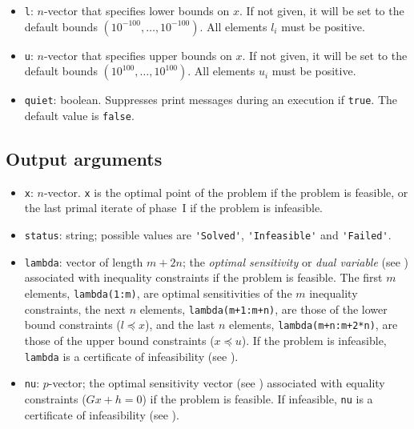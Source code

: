 \documentclass[12pt]{article}
\begin{document}
\begin{itemize}
\item{\tt l}: $n$-vector that specifies lower bounds on $x$.
If not given, it will be set to the default bounds
$(10^{-100}, \ldots, 10^{-100})$. All elements $l_i$ must be positive.

\item{\tt u}: $n$-vector that specifies upper bounds on $x$.
If not given, it will be set to the default bounds
$(10^{100}, \ldots, 10^{100})$. All elements  $u_i$ must be positive.

\item{\tt quiet}: boolean. Suppresses print messages during an execution
if \verb+true+. The default value is \verb+false+.

\end{itemize}


\subsection{Output arguments}

\begin{itemize}
\item{\tt x}: $n$-vector. \verb+x+ is the optimal point of the problem
if the problem is feasible, or the last primal iterate
of phase~I if the problem is infeasible.

\item{\tt status}: string; possible values are
\verb+'Solved'+, \verb+'Infeasible'+ and \verb+'Failed'+.

\item{\tt lambda}: vector of length $m+2n$; the 
\emph{optimal sensitivity} or \emph{dual variable}
(see \cite[\S3.3]{BKVH:05}) associated with inequality 
constraints if the problem is 
feasible. The first $m$ elements, {\tt lambda(1:m)}, are optimal 
sensitivities of the $m$ inequality constraints, the next $n$ 
elements, {\tt lambda(m+1:m+n)}, are those of the lower bound 
constraints ($l \preceq x$), and the last $n$ elements, 
{\tt lambda(m+n:m+2*n)}, are those of the upper bound constraints 
($x \preceq u$). If the problem is infeasible, \verb+lambda+ is a 
certificate of infeasibility (see \cite[\S5.8.1,\S11.4.3]{BKVH:05}).

\item{\tt nu}: $p$-vector; the optimal sensitivity vector 
(see \cite[\S3.3]{BKVH:05}) associated with equality constraints 
($Gx + h = 0$) if the problem is feasible. If infeasible, \verb+nu+ 
is a certificate of infeasibility (see \cite[\S5.8.1,\S11.4.3]{BKVH:05}).
\end{itemize}
\end{document}

